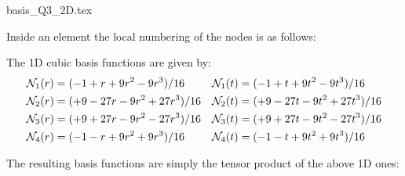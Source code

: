 \begin{flushright} {\tiny {\color{gray} basis\_Q3\_2D.tex}} \end{flushright}

Inside an element the local numbering of the nodes is as follows:



The 1D cubic basis functions are given by:
\begin{align}
{\mathcal{N}}_1(r)&=(-1   +r +9r^2 - 9r^3)/16 & {\mathcal{N}}_1(t)&=(-1   +t +9t^2 - 9t^3)/16 \nonumber\\
{\mathcal{N}}_2(r)&=(+9 -27r -9r^2 +27r^3)/16 & {\mathcal{N}}_2(t)&=(+9 -27t -9t^2 +27t^3)/16 \nonumber\\
{\mathcal{N}}_3(r)&=(+9 +27r -9r^2 -27r^3)/16 & {\mathcal{N}}_3(t)&=(+9 +27t -9t^2 -27t^3)/16 \nonumber\\
{\mathcal{N}}_4(r)&=(-1   -r +9r^2 + 9r^3)/16 & {\mathcal{N}}_4(t)&=(-1   -t +9t^2 + 9t^3)/16 \nonumber
\end{align}

The resulting basis functions are simply the tensor product of the above 1D ones:

